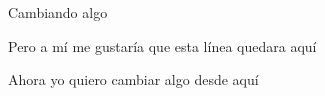\documentclass{article}
\begin{document}
Cambiando algo


Pero a mí me gustaría que esta línea quedara aquí

Ahora yo quiero cambiar algo desde aquí
\end{document}
